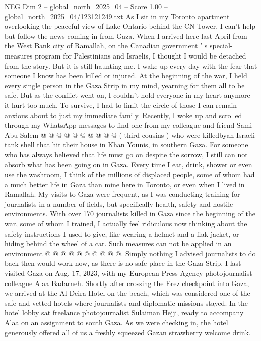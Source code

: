 \begin{textsample}{NEG Dim 2 – global\_north\_2025\_04 – Score 1.00 – global\_north\_2025\_04/123121249.txt}  \label{ex:f2_neg_018}
As I sit in my Toronto apartment overlooking the peaceful view of Lake Ontario behind the CN Tower, I can't help but follow the news coming in from Gaza.
When I arrived here last April from the West Bank city of Ramallah, on the Canadian government ' s special-measures program for Palestinians and Israelis, I thought I would be detached from the story.
But it is still haunting me.
I wake up every day with the fear that someone I know has been killed or injured.
At the beginning of the war, I held every single person in the Gaza Strip in my mind, yearning for them all to be safe.
But as the conflict went on, I couldn't hold everyone in my heart anymore -- it hurt too much.
To survive, I had to limit the circle of those I can remain anxious about to just my immediate family.
Recently, I woke up and scrolled through my WhatsApp messages to find one from my colleague and friend Sami Abu Salem @ @ @ @ @ @ @ @ @ @ ( third cousins ) who were killedbyan Israeli tank shell that hit their house in Khan Younis, in southern Gaza.
For someone who has always believed that life must go on despite the sorrow, I still can not absorb what has been going on in Gaza.
Every time I eat, drink, shower or even use the washroom, I think of the millions of displaced people, some of whom had a much better life in Gaza than mine here in Toronto, or even when I lived in Ramallah.
My visits to Gaza were frequent, as I was conducting training for journalists in a number of fields, but specifically health, safety and hostile environments.
With over 170 journalists killed in Gaza since the beginning of the war, some of whom I trained, I actually feel ridiculous now thinking about the safety instructions I used to give, like wearing a helmet and a flak jacket, or hiding behind the wheel of a car.
Such measures can not be applied in an environment @ @ @ @ @ @ @ @ @ @.
Simply nothing I advised journalists to do back then would work now, as there is no safe place in the Gaza Strip.
I last visited Gaza on Aug. 17, 2023, with my European Press Agency photojournalist colleague Alaa Badarneh.
Shortly after crossing the Erez checkpoint into Gaza, we arrived at the Al Deira Hotel on the beach, which was considered one of the safe and vetted hotels where journalists and diplomatic missions stayed.
In the hotel lobby sat freelance photojournalist Sulaiman Hejji, ready to accompany Alaa on an assignment to south Gaza.
As we were checking in, the hotel generously offered all of us a freshly squeezed Gazan strawberry welcome drink.

\end{textsample}
